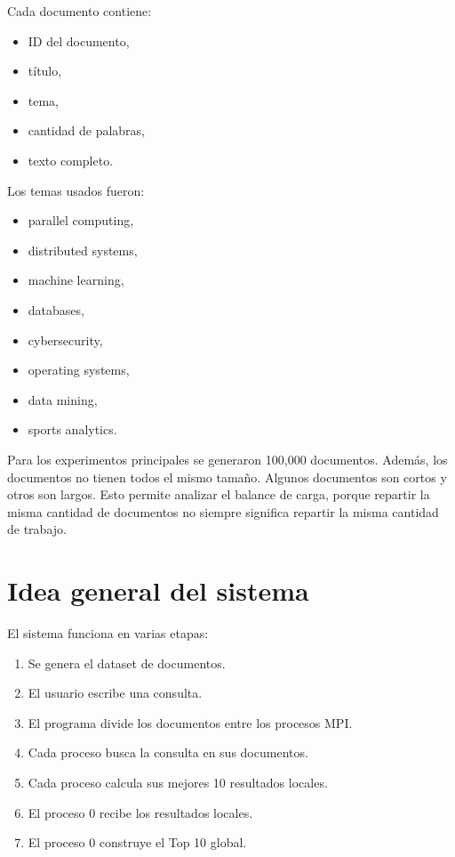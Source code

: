 \documentclass[12pt,letterpaper]{article}
\begin{document}
Cada documento contiene:

\begin{itemize}
\item ID del documento,
\item título,
\item tema,
\item cantidad de palabras,
\item texto completo.
\end{itemize}

Los temas usados fueron:

\begin{itemize}
\item parallel computing,
\item distributed systems,
\item machine learning,
\item databases,
\item cybersecurity,
\item operating systems,
\item data mining,
\item sports analytics.
\end{itemize}

Para los experimentos principales se generaron 100,000 documentos. Además, los documentos no tienen todos el mismo tamaño. Algunos documentos son cortos y otros son largos. Esto permite analizar el balance de carga, porque repartir la misma cantidad de documentos no siempre significa repartir la misma cantidad de trabajo.

\section{Idea general del sistema}

El sistema funciona en varias etapas:

\begin{enumerate}
\item Se genera el dataset de documentos.
\item El usuario escribe una consulta.
\item El programa divide los documentos entre los procesos MPI.
\item Cada proceso busca la consulta en sus documentos.
\item Cada proceso calcula sus mejores 10 resultados locales.
\item El proceso 0 recibe los resultados locales.
\item El proceso 0 construye el Top 10 global.
\end{enumerate}
\end{document}
